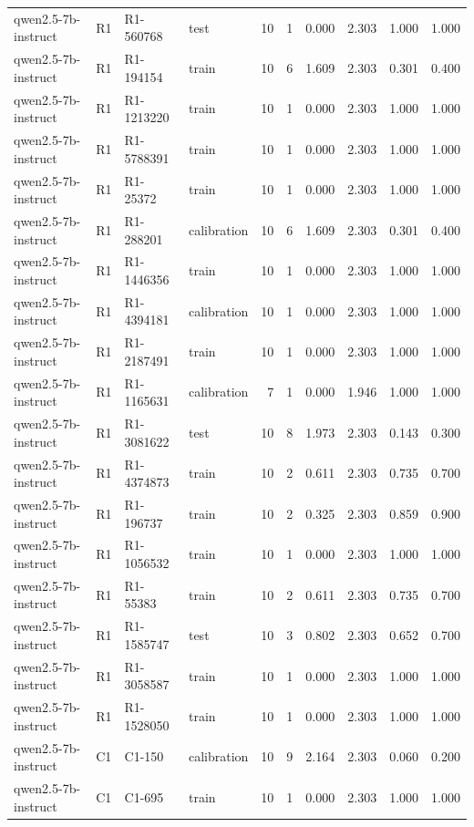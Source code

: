 \begin{table}
\begin{tabular}{llllrrrrrr}
qwen2.5-7b-instruct & R1 & R1-560768 & test & 10 & 1 & 0.000 & 2.303 & 1.000 & 1.000 \\
qwen2.5-7b-instruct & R1 & R1-194154 & train & 10 & 6 & 1.609 & 2.303 & 0.301 & 0.400 \\
qwen2.5-7b-instruct & R1 & R1-1213220 & train & 10 & 1 & 0.000 & 2.303 & 1.000 & 1.000 \\
qwen2.5-7b-instruct & R1 & R1-5788391 & train & 10 & 1 & 0.000 & 2.303 & 1.000 & 1.000 \\
qwen2.5-7b-instruct & R1 & R1-25372 & train & 10 & 1 & 0.000 & 2.303 & 1.000 & 1.000 \\
qwen2.5-7b-instruct & R1 & R1-288201 & calibration & 10 & 6 & 1.609 & 2.303 & 0.301 & 0.400 \\
qwen2.5-7b-instruct & R1 & R1-1446356 & train & 10 & 1 & 0.000 & 2.303 & 1.000 & 1.000 \\
qwen2.5-7b-instruct & R1 & R1-4394181 & calibration & 10 & 1 & 0.000 & 2.303 & 1.000 & 1.000 \\
qwen2.5-7b-instruct & R1 & R1-2187491 & train & 10 & 1 & 0.000 & 2.303 & 1.000 & 1.000 \\
qwen2.5-7b-instruct & R1 & R1-1165631 & calibration & 7 & 1 & 0.000 & 1.946 & 1.000 & 1.000 \\
qwen2.5-7b-instruct & R1 & R1-3081622 & test & 10 & 8 & 1.973 & 2.303 & 0.143 & 0.300 \\
qwen2.5-7b-instruct & R1 & R1-4374873 & train & 10 & 2 & 0.611 & 2.303 & 0.735 & 0.700 \\
qwen2.5-7b-instruct & R1 & R1-196737 & train & 10 & 2 & 0.325 & 2.303 & 0.859 & 0.900 \\
qwen2.5-7b-instruct & R1 & R1-1056532 & train & 10 & 1 & 0.000 & 2.303 & 1.000 & 1.000 \\
qwen2.5-7b-instruct & R1 & R1-55383 & train & 10 & 2 & 0.611 & 2.303 & 0.735 & 0.700 \\
qwen2.5-7b-instruct & R1 & R1-1585747 & test & 10 & 3 & 0.802 & 2.303 & 0.652 & 0.700 \\
qwen2.5-7b-instruct & R1 & R1-3058587 & train & 10 & 1 & 0.000 & 2.303 & 1.000 & 1.000 \\
qwen2.5-7b-instruct & R1 & R1-1528050 & train & 10 & 1 & 0.000 & 2.303 & 1.000 & 1.000 \\
qwen2.5-7b-instruct & C1 & C1-150 & calibration & 10 & 9 & 2.164 & 2.303 & 0.060 & 0.200 \\
qwen2.5-7b-instruct & C1 & C1-695 & train & 10 & 1 & 0.000 & 2.303 & 1.000 & 1.000 \\

\end{tabular}
\end{table}
